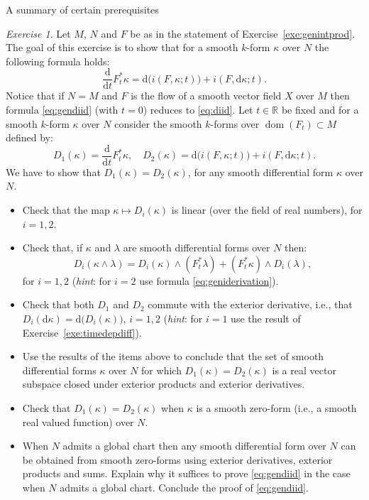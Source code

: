 \documentclass[oneside,a4paper,11pt]{amsbook}
\newcommand{\R}{\mathds R}
\newcommand{\dd}{\mathrm d}
\DeclareMathOperator{\Dom}{dom}
\theoremstyle{remark}\newtheorem{exercise}{Exercise}[chapter]
\theoremstyle{plain}\newtheorem{teo}{Theorem}[section]
\theoremstyle{plain}\newtheorem{lem}[teo]{Lemma}
\theoremstyle{plain}\newtheorem{prop}[teo]{Proposition}
\theoremstyle{plain}\newtheorem{cor}[teo]{Corollary}
\theoremstyle{definition}\newtheorem{defin}[teo]{Definition}
\theoremstyle{remark}\newtheorem{rem}[teo]{Remark}
\theoremstyle{definition}\newtheorem{notation}[teo]{Notation}
\theoremstyle{definition}\newtheorem{convention}[teo]{Convention}
\theoremstyle{definition}\newtheorem{example}[teo]{Example}
\numberwithin{section}{chapter}
\numberwithin{equation}{section}
\begin{document}
\begin{chapter}{A summary of certain prerequisites}
\begin{exercise}\label{exe:gendiid}
Let $M$, $N$ and $F$ be as in the statement of Exercise~\ref{exe:genintprod}. The goal of this exercise is to show
that for a smooth $k$-form $\kappa$ over $N$ the following formula holds:
\begin{equation}\label{eq:gendiid}
\frac{\dd}{\dd t}F_t^*\kappa=\dd\big(i(F,\kappa;t)\big)+i(F,\dd\kappa;t).
\end{equation}
Notice that if $N=M$ and $F$ is the flow of a smooth vector field $X$ over $M$ then formula \eqref{eq:gendiid} (with $t=0$) reduces to
\eqref{eq:diid}.
Let $t\in\R$ be fixed and for a smooth $k$-form $\kappa$ over $N$ consider the smooth $k$-forms over
$\Dom(F_t)\subset M$ defined by:
\[D_1(\kappa)=\frac{\dd}{\dd t}F_t^*\kappa,\quad
D_2(\kappa)=\dd\big(i(F,\kappa;t)\big)+i(F,\dd\kappa;t).\]
We have to show that $D_1(\kappa)=D_2(\kappa)$, for any smooth differential form $\kappa$ over $N$.
\begin{itemize}
\item[(a)] Check that the map $\kappa\mapsto D_i(\kappa)$ is linear (over the field of real numbers), for $i=1,2$.
\item[(b)] Check that, if $\kappa$ and $\lambda$ are smooth differential forms over $N$ then:
\[D_i(\kappa\wedge\lambda)=D_i(\kappa)\wedge(F_t^*\lambda)+(F_t^*\kappa)\wedge D_i(\lambda),\]
for $i=1,2$ ({\em hint}: for $i=2$ use formula \eqref{eq:geniderivation}).
\item[(c)] Check that both $D_1$ and $D_2$ commute with the exterior derivative, i.e.,
that $D_i(\dd\kappa)=\dd\big(D_i(\kappa)\big)$, $i=1,2$ ({\em hint}: for $i=1$ use
the result of Exercise~\ref{exe:timedepdiff}).
\item[(d)] Use the results of the items above to conclude that the set of smooth differential forms $\kappa$ over $N$
for which $D_1(\kappa)=D_2(\kappa)$ is a real vector subspace closed under exterior products and exterior derivatives.
\item[(e)] Check that $D_1(\kappa)=D_2(\kappa)$ when $\kappa$ is a smooth zero-form (i.e., a smooth real valued function)
over $N$.
\item[(f)] When $N$ admits a global chart then any smooth differential form over $N$ can be obtained from smooth
zero-forms using exterior derivatives, exterior products and sums. Explain why it suffices to prove \eqref{eq:gendiid}
in the case when $N$ admits a global chart. Conclude the proof of \eqref{eq:gendiid}.
\end{itemize}
\end{exercise}

\end{chapter}
\end{document}
